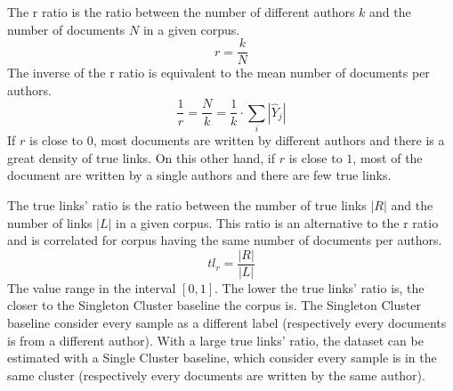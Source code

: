 \begin{definition}
  The r ratio is the ratio between the number of different authors $k$ and the number of documents $N$ in a given corpus.
  \begin{equation}
    r = \frac{k}{N}
  \end{equation}
  The inverse of the r ratio is equivalent to the mean number of documents per authors.
  \begin{equation}
    \frac{1}{r} = \frac{N}{k} = \frac{1}{k} \cdot \sum_{i} |\hat{Y}_j|
  \end{equation}
  If $r$ is close to $0$, most documents are written by different authors and there is a great density of true links.
  On this other hand, if $r$ is close to $1$, most of the document are written by a single authors and there are few true links.
\end{definition}

\begin{definition}
  The true links' ratio is the ratio between the number of true links $|R|$ and the number of links $|L|$ in a given corpus.
  This ratio is an alternative to the r ratio and is correlated for corpus having the same number of documents per authors.
  \begin{equation}
    tl_r = \frac{|R|}{|L|}
  \end{equation}
  The value range in the interval $\left[0, 1\right]$.
  The lower the true links' ratio is, the closer to the Singleton Cluster baseline the corpus is.
  The Singleton Cluster baseline consider every sample as a different label (respectively every documents is from a different author).
  With a large true links' ratio, the dataset can be estimated with a Single Cluster baseline, which consider every sample is in the same cluster (respectively every documents are written by the same author).
\end{definition}
